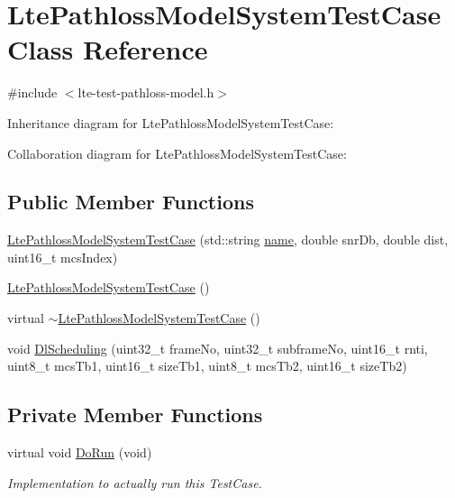 \hypertarget{classLtePathlossModelSystemTestCase}{}\section{Lte\+Pathloss\+Model\+System\+Test\+Case Class Reference}
\label{classLtePathlossModelSystemTestCase}


{\ttfamily \#include $<$lte-\/test-\/pathloss-\/model.\+h$>$}



Inheritance diagram for Lte\+Pathloss\+Model\+System\+Test\+Case\+:


Collaboration diagram for Lte\+Pathloss\+Model\+System\+Test\+Case\+:
\subsection*{Public Member Functions}
\begin{DoxyCompactItemize}
\item 
\hyperlink{classLtePathlossModelSystemTestCase_a8b914763e3bc87fb25319f8dab20cea0}{Lte\+Pathloss\+Model\+System\+Test\+Case} (std\+::string \hyperlink{generate__test__data__lte__spectrum__model_8m_ab74e6bf80237ddc4109968cedc58c151}{name}, double snr\+Db, double dist, uint16\+\_\+t mcs\+Index)
\item 
\hyperlink{classLtePathlossModelSystemTestCase_ac3926d194920c4bea5994b56e5ca416a}{Lte\+Pathloss\+Model\+System\+Test\+Case} ()
\item 
virtual \hyperlink{classLtePathlossModelSystemTestCase_ad380dec1b498bc8323e6fc0f16cb61fb}{$\sim$\+Lte\+Pathloss\+Model\+System\+Test\+Case} ()
\item 
void \hyperlink{classLtePathlossModelSystemTestCase_a082257f6c8ebfb68683a157f6d8ac12d}{Dl\+Scheduling} (uint32\+\_\+t frame\+No, uint32\+\_\+t subframe\+No, uint16\+\_\+t rnti, uint8\+\_\+t mcs\+Tb1, uint16\+\_\+t size\+Tb1, uint8\+\_\+t mcs\+Tb2, uint16\+\_\+t size\+Tb2)
\end{DoxyCompactItemize}
\subsection*{Private Member Functions}
\begin{DoxyCompactItemize}
\item 
virtual void \hyperlink{classLtePathlossModelSystemTestCase_a6cf8d23b5eab69a72e893419bbd13c1b}{Do\+Run} (void)
\begin{DoxyCompactList}\small\item\em Implementation to actually run this Test\+Case. \end{DoxyCompactList}\end{DoxyCompactItemize}
